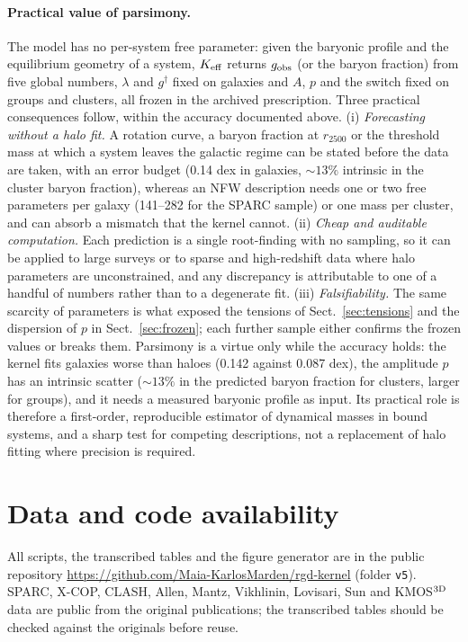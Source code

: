 \documentclass[11pt,a4paper]{article}
\newcommand{\gdag}{g^{\dagger}}
\newcommand{\Keff}{K_{\rm eff}}
\begin{document}
\paragraph{Practical value of parsimony.} The model has no per-system free parameter: given the baryonic profile and the equilibrium geometry of a system, $\Keff$ returns $g_{\rm obs}$ (or the baryon fraction) from five global numbers, $\lambda$ and $\gdag$ fixed on galaxies and $A$, $p$ and the switch fixed on groups and clusters, all frozen in the archived prescription. Three practical consequences follow, within the accuracy documented above. (i) \emph{Forecasting without a halo fit.} A rotation curve, a baryon fraction at $r_{2500}$ or the threshold mass at which a system leaves the galactic regime can be stated before the data are taken, with an error budget (0.14 dex in galaxies, $\sim13\%$ intrinsic in the cluster baryon fraction), whereas an NFW description needs one or two free parameters per galaxy (141--282 for the SPARC sample) or one mass per cluster, and can absorb a mismatch that the kernel cannot. (ii) \emph{Cheap and auditable computation.} Each prediction is a single root-finding with no sampling, so it can be applied to large surveys or to sparse and high-redshift data where halo parameters are unconstrained, and any discrepancy is attributable to one of a handful of numbers rather than to a degenerate fit. (iii) \emph{Falsifiability.} The same scarcity of parameters is what exposed the tensions of Sect.~\ref{sec:tensions} and the dispersion of $p$ in Sect.~\ref{sec:frozen}; each further sample either confirms the frozen values or breaks them. Parsimony is a virtue only while the accuracy holds: the kernel fits galaxies worse than haloes (0.142 against 0.087 dex), the amplitude $p$ has an intrinsic scatter ($\sim13\%$ in the predicted baryon fraction for clusters, larger for groups), and it needs a measured baryonic profile as input. Its practical role is therefore a first-order, reproducible estimator of dynamical masses in bound systems, and a sharp test for competing descriptions, not a replacement of halo fitting where precision is required.

\section*{Data and code availability}
All scripts, the transcribed tables and the figure generator are in the public repository \url{https://github.com/Maia-KarlosMarden/rgd-kernel} (folder \texttt{v5}). SPARC, X-COP, CLASH, Allen, Mantz, Vikhlinin, Lovisari, Sun and KMOS$^{\rm 3D}$ data are public from the original publications; the transcribed tables should be checked against the originals before reuse.
\end{document}
